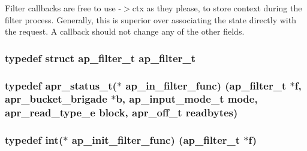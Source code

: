 Filter callbacks are free to use -\/$>$ctx as they please, to store context during the filter process. Generally, this is superior over associating the state directly with the request. A callback should not change any of the other fields. 
\subsubsection[{\texorpdfstring{ap\+\_\+filter\+\_\+t}{ap_filter_t}}]{\setlength{\rightskip}{0pt plus 5cm}typedef struct {\bf ap\+\_\+filter\+\_\+t} {\bf ap\+\_\+filter\+\_\+t}}\hypertarget{group__APACHE__CORE__FILTER_gad543721589f525abb9b0fbd5cb8363e6}{}\label{group__APACHE__CORE__FILTER_gad543721589f525abb9b0fbd5cb8363e6}
\subsubsection[{\texorpdfstring{ap\+\_\+in\+\_\+filter\+\_\+func}{ap_in_filter_func}}]{\setlength{\rightskip}{0pt plus 5cm}typedef {\bf apr\+\_\+status\+\_\+t}($\ast$ ap\+\_\+in\+\_\+filter\+\_\+func) ({\bf ap\+\_\+filter\+\_\+t} $\ast${\bf f}, {\bf apr\+\_\+bucket\+\_\+brigade} $\ast${\bf b}, {\bf ap\+\_\+input\+\_\+mode\+\_\+t} {\bf mode}, {\bf apr\+\_\+read\+\_\+type\+\_\+e} {\bf block}, {\bf apr\+\_\+off\+\_\+t} {\bf readbytes})}\hypertarget{group__APACHE__CORE__FILTER_ga8e6e76deedf9ef3e3a4aa33419663875}{}\label{group__APACHE__CORE__FILTER_ga8e6e76deedf9ef3e3a4aa33419663875}
\subsubsection[{\texorpdfstring{ap\+\_\+init\+\_\+filter\+\_\+func}{ap_init_filter_func}}]{\setlength{\rightskip}{0pt plus 5cm}typedef {\bf int}($\ast$ ap\+\_\+init\+\_\+filter\+\_\+func) ({\bf ap\+\_\+filter\+\_\+t} $\ast${\bf f})}\hypertarget{group__APACHE__CORE__FILTER_ga7ecd47b41aacab276198f6d1fc05a56c}{}\label{group__APACHE__CORE__FILTER_ga7ecd47b41aacab276198f6d1fc05a56c}
